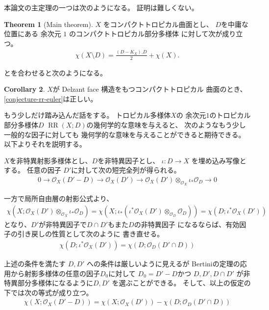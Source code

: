 \documentclass[a4paper,dvipdfmx,reqno,12pt]{amsart}
\theoremstyle{definition}
\newtheorem{theorem}{Theorem}[section]
\newtheorem{corollary}[theorem]{Corollary}
\newcommand{\opn}[1]{\operatorname{#1}}
\numberwithin{equation}{section}
\begin{document}
本論文の主定理の一つは次のようになる。
証明は難しくない。
\begin{theorem}[{Main theorem}]
\label{theorem-rr-euler-surface}
$X$ をコンパクトトロピカル曲面とし、
$D$を中庸な位置にある
余次元 $1$ のコンパクトトロピカル部分多様体
に対して次が成り立つ。
\begin{align}
\chi(X\setminus D)=\frac{(D-K_X). D}{2}+
\chi(X).
\end{align}
\end{theorem}
\cite[Theorem 6.3]{demedrano2023chern}
とを合わせると次のようになる。
\begin{corollary}
$X$が Delzant face 構造をもつコンパクトトロピカル
曲面のとき、 \cref{conjecture-rr-euler}は正しい。
\end{corollary}

もう少しだけ踏み込んだ話をする。
トロピカル多様体$X$の
余次元$1$のトロピカル部分多様体$D$
$\opn{RR}(X;D)$の幾何学的な意味を与えると、
次のようなもう少し一般的な因子に対しても
幾何学的な意味を与えることができると期待できる。
以下よりそれを説明する。

$X$を非特異射影多様体とし、$D$を非特異因子とし、
$\iota\colon D\to X$ を埋め込み写像とする。
任意の因子 $D'$に対して次の短完全列が得られる。
\begin{align}
0 \to \mathcal{O}_X(D'-D)\to \mathcal{O}_X(D')
\to \mathcal{O}_X(D')
\otimes_{\mathcal{O}_X} \iota_*\mathcal{O}_D \to 0 
\end{align}

一方で局所自由層の射影公式より、
\begin{align}
\chi(X;\mathcal{O}_X(D')\otimes_{\mathcal{O}_X} \iota_*\mathcal{O}_D)
=\chi(X;\iota_*(\iota^{*}\mathcal{O}_X(D')\otimes_{\mathcal{O}_D} \mathcal{O}_D))
=\chi(D;\iota^{*}\mathcal{O}_X(D'))
\end{align}
となり、$D'$が非特異因子で$D\cap D'$もまた$D$の非特異因子
になるならば、有効因子の引き戻しの性質として次のように
書き直せる。
\begin{align}
\chi(D;\iota^{*}\mathcal{O}_X(D'))=\chi(D;\mathcal{O}_D(D'\cap D))
\end{align}

上述の条件を満たす $D,D'$ への条件は厳しいように見えるが
Bertiniの定理の応用から射影多様体の任意の因子$D_0$に対して
$D_0=D'-D$かつ
$D,D',D\cap D'$ が非特異部分多様体になるように$D,D'$
を選ぶことができる。
そして、以上の仮定の下では次の等式が成り立つ。
\begin{align}
\chi(X;\mathcal{O}_X(D'-D))=
\chi(X;\mathcal{O}_X(D'))-
\chi(D;\mathcal{O}_D(D'\cap D))
\end{align}
\end{document}
